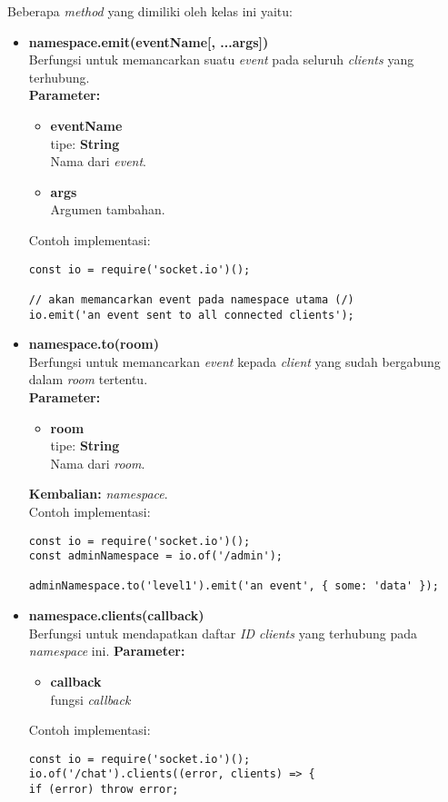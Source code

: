 \begin{enumerate}
	Beberapa \textit{method} yang dimiliki oleh kelas ini yaitu:
	\begin{itemize}
		\item \textbf{namespace.emit(eventName[, ...args])} \\
		Berfungsi untuk memancarkan suatu \textit{event} pada seluruh \textit{clients} yang terhubung. \\
		\textbf{Parameter:}
		\begin{itemize}
			\item \textbf{eventName} \\tipe: \textbf{String} \\ Nama dari \textit{event}.
			\item \textbf{args} \\ Argumen tambahan.
		\end{itemize}
		Contoh implementasi:
\begin{lstlisting}
const io = require('socket.io')();
		
// akan memancarkan event pada namespace utama (/)
io.emit('an event sent to all connected clients'); 
\end{lstlisting}
		
		\item \textbf{namespace.to(room)} \\ 
		Berfungsi untuk memancarkan \textit{event} kepada \textit{client} yang sudah bergabung dalam \textit{room} tertentu. \\ 
		\textbf{Parameter:}
		\begin{itemize}
			\item \textbf{room} \\tipe: \textbf{String} \\ Nama dari \textit{room}.
		\end{itemize}
		\textbf{Kembalian:} \textit{namespace}. \\
		Contoh implementasi:
\begin{lstlisting}
const io = require('socket.io')();
const adminNamespace = io.of('/admin');
	
adminNamespace.to('level1').emit('an event', { some: 'data' });
\end{lstlisting}
	
		\item \textbf{namespace.clients(callback)} \\
		Berfungsi untuk mendapatkan daftar \textit{ID clients} yang terhubung pada \textit{namespace} ini.
		\textbf{Parameter:}
		\begin{itemize}
			\item \textbf{callback} \\ fungsi \textit{callback}
		\end{itemize}
		Contoh implementasi:
\begin{lstlisting}
const io = require('socket.io')();
io.of('/chat').clients((error, clients) => {
if (error) throw error;
	

\end{lstlisting}
\end{itemize}
\end{enumerate}
